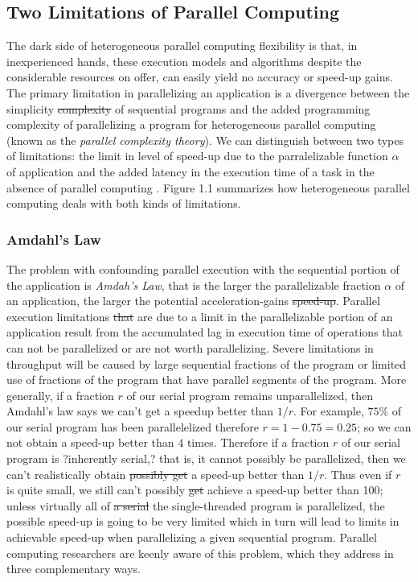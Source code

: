 \documentclass[10pt]{article}[draft]
\begin{document}
\newpage
\subsection{Two Limitations of Parallel Computing}
		
		The dark side of heterogeneous parallel computing flexibility is that, in inexperienced hands, these execution models and algorithms despite the considerable resources on offer, can easily yield no accuracy or speed-up gains. The primary limitation in parallelizing an application is a divergence between the simplicity \st{complexity} of sequential programs and the added programming complexity of parallelizing a program for heterogeneous parallel computing  (known as the \emph{parallel complexity theory}). We can distinguish between two types of limitations: the limit in level of speed-up due to the parralelizable function $\alpha$ of application and the added latency in the execution time of a task in the  absence of parallel computing . Figure 1.1 summarizes how heterogeneous parallel computing  deals with both kinds of limitations.
		
	\subsubsection{Amdahl's Law}
		
	The problem with confounding parallel execution with the sequential portion of the application  is  \emph{Amdah's Law}, that is  the larger the parallelizable fraction $\alpha$ of an application, the larger the potential acceleration-gains \st{speed-up}. Parallel execution limitations \st{that} are due to a limit in the parallelizable portion of an application result from the accumulated lag in execution time of operations that can not be parallelized or are not worth parallelizing.  Severe limitations in throughput will be caused by large sequential fractions of the program or limited use of fractions of the program that have  parallel segments of the program. More generally, if a fraction $r$ of our serial program remains unparallelized, then Amdahl's law says we can't get a speedup better than $1/r$. For example, $75\%$ of our serial program has been parallelelized therefore $r = 1 - 0.75 = 0.25$; so we can not obtain a speed-up better than $4$ times. Therefore if a fraction $r$ of our serial program is ?inherently serial,? that is, it cannot possibly be parallelized, then we can't realistically obtain \st{possibly get} a speed-up better than $1/r$. Thus even if $r$ is quite small, we still can't possibly \st{get} achieve a speed-up better than 100; unless virtually all of \st{a serial} the single-threaded program is parallelized, the possible speed-up is going to be very limited  which in turn will lead to limits in achievable speed-up when parallelizing a given sequential program. Parallel computing researchers are keenly aware of this problem, which they address in three complementary ways. 
	
\end{document}
